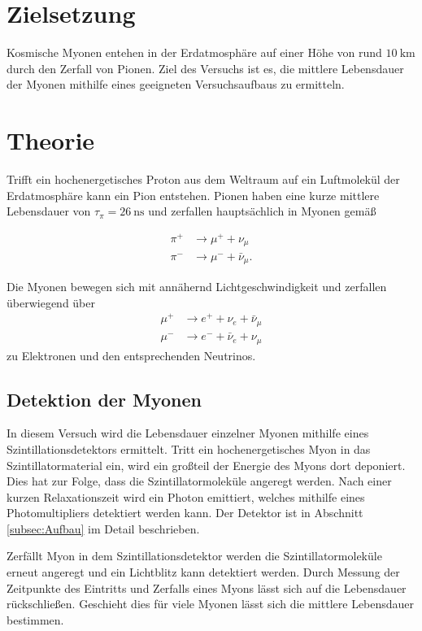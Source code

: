 \section{Zielsetzung}
\label{sec:Zielsetzung}
Kosmische Myonen entehen in der Erdatmosphäre auf einer Höhe von rund $\qty{10}{\kilo\metre}$ durch den Zerfall von Pionen. Ziel des Versuchs ist es, die 
mittlere Lebensdauer der Myonen mithilfe eines geeigneten Versuchsaufbaus zu ermitteln.


\section{Theorie}
\label{sec:Theorie}
Trifft ein hochenergetisches Proton aus dem Weltraum auf ein Luftmolekül der Erdatmosphäre kann ein Pion entstehen. Pionen haben eine kurze mittlere 
Lebensdauer von $\tau_\pi = \qty{26}{\nano\second}$ und zerfallen hauptsächlich in Myonen gemäß

\begin{align*}
    \pi^+ &\to \mu^+ + \nu_\mu \\
    \pi^- &\to \mu^- + \bar{\nu}_\mu.
\end{align*}

Die Myonen bewegen sich mit annähernd Lichtgeschwindigkeit und zerfallen überwiegend über 
\begin{align*}
    \mu^+ &\to e^+ + \nu_e + \bar{\nu}_\mu \\
    \mu^- &\to e^- + \bar{\nu}_e + \nu_\mu
\end{align*}
zu Elektronen und den entsprechenden Neutrinos.

\subsection{Detektion der Myonen}
\label{subsec:Detektion der Myonen}
In diesem Versuch wird die Lebensdauer einzelner Myonen mithilfe eines Szintillationsdetektors ermittelt. Tritt ein hochenergetisches Myon in das Szintillatormaterial
ein, wird ein großteil der Energie des Myons dort deponiert. Dies hat zur Folge, dass die Szintillatormoleküle angeregt werden. Nach einer kurzen Relaxationszeit
wird ein Photon emittiert, welches mithilfe eines Photomultipliers detektiert werden kann. Der Detektor ist in Abschnitt \ref{subsec:Aufbau} im Detail beschrieben.

Zerfällt Myon in dem Szintillationsdetektor werden die Szintillatormoleküle erneut angeregt und ein Lichtblitz kann detektiert werden. Durch Messung der Zeitpunkte des Eintritts
und Zerfalls eines Myons lässt sich auf die Lebensdauer rückschließen. Geschieht dies für viele Myonen lässt sich die mittlere Lebensdauer bestimmen.

